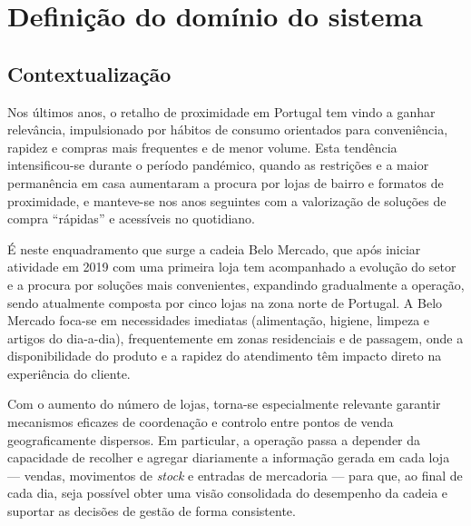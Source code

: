 
\chapter{Definição do domínio do sistema}

\section{Contextualização}

    Nos últimos anos, o retalho de proximidade em Portugal tem vindo a ganhar relevância, impulsionado por hábitos de consumo orientados para conveniência, rapidez e compras mais frequentes e de menor volume. Esta tendência intensificou-se durante o período pandémico, quando as restrições e a maior permanência em casa aumentaram a procura por lojas de bairro e formatos de proximidade, e manteve-se nos anos seguintes com a valorização de soluções de compra ``rápidas'' e acessíveis no quotidiano.

    É neste enquadramento que surge a cadeia Belo Mercado, que após iniciar atividade em 2019 com uma primeira loja tem acompanhado a evolução do setor e a procura por soluções mais convenientes, expandindo gradualmente a operação, sendo atualmente composta por cinco lojas na zona norte de Portugal. A Belo Mercado foca-se em necessidades imediatas (alimentação, higiene, limpeza e artigos do dia-a-dia), frequentemente em zonas residenciais e de passagem, onde a disponibilidade do produto e a rapidez do atendimento têm impacto direto na experiência do cliente.

    Com o aumento do número de lojas, torna-se especialmente relevante garantir mecanismos eficazes de coordenação e controlo entre pontos de venda geograficamente dispersos. Em particular, a operação passa a depender da capacidade de recolher e agregar diariamente a informação gerada em cada loja --- vendas, movimentos de \textit{stock} e entradas de mercadoria --- para que, ao final de cada dia, seja possível obter uma visão consolidada do desempenho da cadeia e suportar as decisões de gestão de forma consistente.

